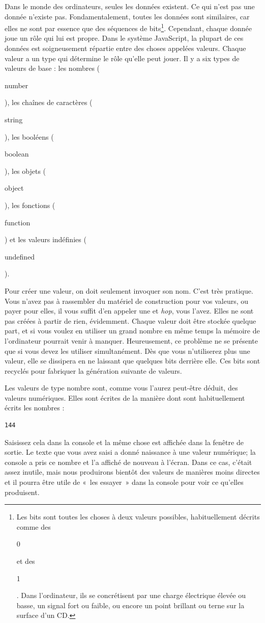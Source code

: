\documentclass{FramateX}
\renewcommand{\texttt}[1]{\begin{sffamily}{#1}\end{sffamily}}
\begin{document}
Dans le monde des ordinateurs, seules les données existent. Ce qui n'est
pas une donnée n'existe pas. Fondamentalement, toutes les données sont
similaires, car elles ne sont par essence que des séquences de
bits\footnote{Les bits sont toutes les choses à deux valeurs possibles, habituellement décrits comme des \texttt{0} et des \texttt{1}. Dans l'ordinateur, ils se concrétisent par une charge électrique élevée ou basse, un signal fort ou faible, ou encore un point brillant ou terne sur la surface d'un CD.}. Cependant, chaque donnée joue un rôle qui lui est propre. Dans le système JavaScript, la plupart de ces données est soigneusement répartie entre des choses appelées valeurs. Chaque valeur a un type qui détermine le rôle qu'elle peut jouer. Il y a six types de valeurs de base : les nombres (\texttt{number}), les chaînes de caractères (\texttt{string}), les booléens (\texttt{boolean}), les objets (\texttt{object}), les fonctions (\texttt{function}) et les valeurs indéfinies (\texttt{undefined}).

Pour créer une valeur, on doit seulement invoquer son nom. C'est très
pratique. Vous n'avez pas à rassembler du matériel de construction pour
vos valeurs, ou payer pour elles, il vous suffit d'en appeler une et
\emph{hop}, vous l'avez. Elles ne sont pas créées à partir de rien,
évidemment. Chaque valeur doit être stockée quelque part, et si vous
voulez en utiliser un grand nombre en même temps la mémoire de
l'ordinateur pourrait venir à manquer. Heureusement, ce problème ne se
présente que si vous devez les utiliser simultanément. Dès que vous
n'utiliserez plus une valeur, elle se dissipera en ne laissant que
quelques bits derrière elle. Ces bits sont recyclés pour fabriquer la
génération suivante de valeurs.

\begin{center}\end{center}

Les valeurs de type nombre sont, comme vous l'aurez peut-être déduit,
des valeurs numériques. Elles sont écrites de la manière dont sont
habituellement écrits les nombres :

\begin{lstlisting}
144
\end{lstlisting}
Saisissez cela dans la console et la même chose est affichée dans la
fenêtre de sortie. Le texte que vous avez saisi a donné naissance à une
valeur numérique; la console a pris ce nombre et l'a affiché de nouveau
à l'écran. Dans ce cas, c'était assez inutile, mais nous produirons
bientôt des valeurs de manières moins directes et il pourra être utile
de «~les essayer~» dans la console pour voir ce qu'elles produisent.
\end{document}
